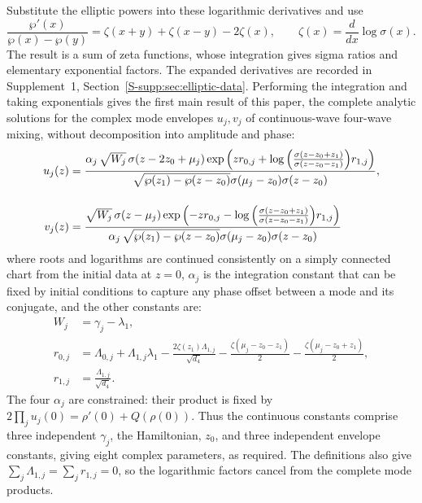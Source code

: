 \documentclass{optica-article}
\numberwithin{equation}{section}
\begin{document}
Substitute the elliptic powers into these logarithmic derivatives and use
\begin{equation}
\frac{\wp'(x)}{\wp(x)-\wp(y)}=\zeta(x+y)+\zeta(x-y)-2\zeta(x),
\qquad \zeta(x)=\frac{d}{dx}\log\sigma(x).
\end{equation}
The result is a sum of zeta functions, whose integration gives sigma ratios and elementary exponential factors.
The expanded derivatives are recorded in Supplement~1, Section~\ref*{S-supp:sec:elliptic-data}.
Performing the integration and taking exponentials gives the first main result of this paper, the complete analytic solutions for the complex mode envelopes $u_j,v_j$ of continuous-wave four-wave mixing, without decomposition into amplitude and phase:
\begin{align}
u_j{\left(z\right)} &= \frac{\alpha_j\,\sqrt{W_j} \,\sigma{\left(z - 2 z_{0} + {\mu}_{j} \right)} \exp\left(z {r}_{0,j} + \log{\left(\frac{\sigma{\left(z - z_{0} + z_{1} \right)}}{\sigma{\left(z - z_{0} - z_{1} \right)}} \right)} {r}_{1,j}\right)}{\sqrt{\wp{\left(z_{1} \right)} - \wp{\left(z - z_{0} \right)}} \sigma{\left({\mu}_{j} - z_{0}\right)} \sigma{\left(z - z_{0} \right)}}, \notag \\[12pt]
v_j{\left(z\right)} &= \frac{\sqrt{W_j} \, \sigma{\left(z - {\mu}_{j} \right)} \exp\left(- z {r}_{0,j} - \log{\left(\frac{\sigma{\left(z - z_{0} + z_{1} \right)}}{\sigma{\left(z - z_{0} - z_{1} \right)}} \right)} {r}_{1,j} \right)}{\alpha_j\,\sqrt{\wp{\left(z_{1} \right)} - \wp{\left(z - z_{0} \right)}} \sigma{\left({\mu}_{j} - z_{0}\right)} \sigma{\left(z - z_{0} \right)}} \label{eq:u-v-quartic}
\end{align}
where roots and logarithms are continued consistently on a simply connected chart from the initial data at $z=0$, $\alpha_j$ is the integration constant that can be fixed by initial conditions to capture any phase offset between a mode and its conjugate, and the other constants are:
\begin{align}
W_j &= \gamma_j-\lambda_1, \\[6pt]
r_{0,j} &= {\Lambda}_{0,j} + {\Lambda}_{1,j} {\lambda}_{1} - \frac{2 \zeta{\left(z_{1} \right)} {\Lambda}_{1,j}}{\sqrt{{d}_{4}}} - \frac{\zeta{\left({\mu}_{j} - z_{0} - z_{1}\right)}}{2} - \frac{\zeta{\left({\mu}_{j} - z_{0} + z_{1}\right)}}{2}, \\[6pt]
r_{1,j} &= \frac{{\Lambda}_{1,j}}{\sqrt{{d}_{4}}}.
\end{align}
The four $\alpha_j$ are constrained: their product is fixed by $2\prod_j u_j(0)=\rho'(0)+Q(\rho(0))$.
Thus the continuous constants comprise three independent $\gamma_j$, the Hamiltonian, $z_0$, and three independent envelope constants, giving eight complex parameters, as required.
The definitions also give $\sum_j\Lambda_{1,j}=\sum_jr_{1,j}=0$, so the logarithmic factors cancel from the complete mode products.
\end{document}
